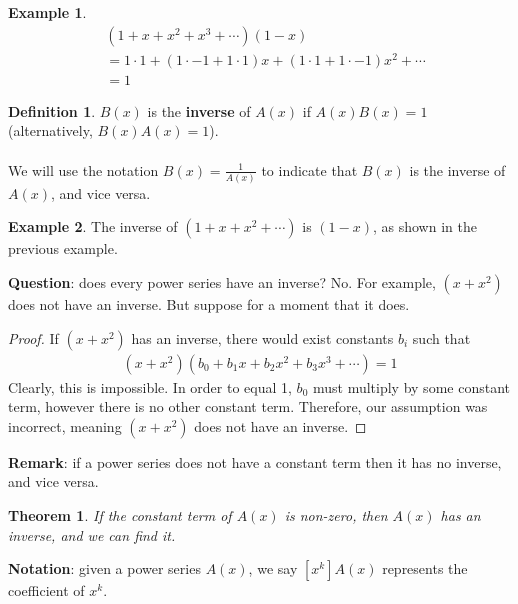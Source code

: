 \documentclass[]{article}
\newtheorem{theorem}{Theorem}[section]
\theoremstyle{definition}
\newtheorem{defn}{Definition}[section]
\newtheorem{ex}{Example}[section]
\begin{document}
			\begin{ex}
				\begin{align*}
					&(1 + x + x^2 + x^3 + \cdots)(1 - x) \\
					&= 1 \cdot 1 + (1 \cdot -1 + 1 \cdot 1)x + (1 \cdot 1 + 1 \cdot -1)x^2 + \cdots \\
					& = 1
				\end{align*}
			\end{ex}

			\begin{defn}
				$B(x)$ is the \textbf{inverse} of $A(x)$ if $A(x)B(x) = 1$ (alternatively, $B(x)A(x) = 1$).
				\\ \\
				We will use the notation $B(x) = \frac{1}{A(x)}$ to indicate that $B(x)$ is the inverse of $A(x)$, and vice versa. 
			\end{defn}

			\begin{ex}
				The inverse of $(1 + x + x^2 + \cdots)$ is $(1 - x)$, as shown in the previous example.
			\end{ex}

			\textbf{Question}: does every power series have an inverse? No. For example, $(x + x^2)$ does not have an inverse. But suppose for a moment that it does.
			\begin{proof}
				If $(x + x^2)$ has an inverse, there would exist constants $b_i$ such that
				\begin{align*}
					(x + x^2)(b_0 + b_1x + b_2x^2 + b_3x^3 + \cdots) = 1
				\end{align*}
				Clearly, this is impossible. In order to equal 1, $b_0$ must multiply by some constant term, however there is no other constant term. Therefore, our assumption was incorrect, meaning $(x + x^2)$ does not have an inverse.
			\end{proof}

			\textbf{Remark}: if a power series does not have a constant term then it has no inverse, and vice versa.
			\begin{theorem}
				If the constant term of $A(x)$ is non-zero, then $A(x)$ has an inverse, and we can find it.
			\end{theorem}

			\textbf{Notation}: given a power series $A(x)$, we say $[x^k]A(x)$ represents the coefficient of $x^k$.
\end{document}
